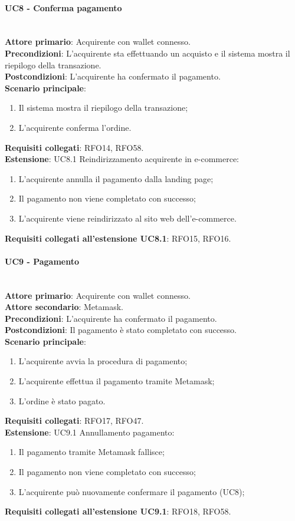 \documentclass[a4paper, 12pt]{article}
\begin{document}
\paragraph{UC8 - Conferma pagamento}\\
\textbf{Attore primario}: Acquirente con wallet connesso.\\
\textbf{Precondizioni}: L'acquirente sta effettuando un acquisto e il sistema mostra il riepilogo della transazione.\\
\textbf{Postcondizioni}: L'acquirente ha confermato il pagamento.\\
\textbf{Scenario principale}:
\begin{enumerate}
    \item Il sistema mostra il riepilogo della transazione;
    \item L'acquirente conferma l'ordine.
\end{enumerate}
\textbf{Requisiti collegati}: RFO14, RFO58.\\
\textbf{Estensione}:
UC8.1 Reindirizzamento acquirente in e-commerce:
\begin{enumerate}
    \item L'acquirente annulla il pagamento dalla landing page;
    \item Il pagamento non viene completato con successo;
    \item L'acquirente viene reindirizzato al sito web dell'e-commerce.
\end{enumerate}
\textbf{Requisiti collegati all'estensione UC8.1}: RFO15, RFO16.

\paragraph{UC9 - Pagamento}\\
\textbf{Attore primario}: Acquirente con wallet connesso.\\
\textbf{Attore secondario}: Metamask.\\
\textbf{Precondizioni}: L'acquirente ha confermato il pagamento.\\
\textbf{Postcondizioni}: Il pagamento è stato completato con successo.\\
\textbf{Scenario principale}:
\begin{enumerate}
    \item L'acquirente avvia la procedura di pagamento;
    \item L'acquirente effettua il pagamento tramite Metamask;
    \item L'ordine è stato pagato.
\end{enumerate}
\textbf{Requisiti collegati}: RFO17, RFO47.\\
\textbf{Estensione}:
UC9.1 Annullamento pagamento:
\begin{enumerate}
    \item Il pagamento tramite Metamask fallisce;
    \item Il pagamento non viene completato con successo;
    \item L'acquirente può nuovamente confermare il pagamento (UC8);
\end{enumerate}
\textbf{Requisiti collegati all'estensione UC9.1}: RFO18, RFO58.
\end{document}

